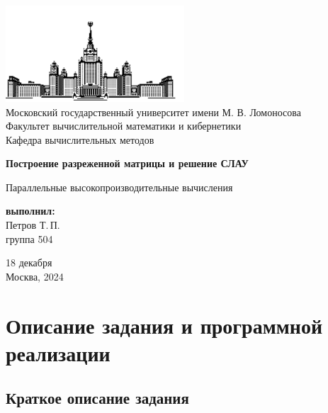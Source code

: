 \documentclass[12pt, a4paper]{article}
\begin{document}
	
\thispagestyle{empty}

\begin{center}
	\ \vspace{-3cm}
	
	\includegraphics[width=0.5\textwidth]{msu-eps-converted-to.pdf}\\
	{Московский государственный университет имени М. В. Ломоносова}\\
	Факультет вычислительной математики и кибернетики\\
	Кафедра вычислительных методов
	
	\vspace{6cm}
	
	{\Large \bfseries Построение разреженной матрицы и решение СЛАУ}
	
	\vspace{1cm}
	
	{\large Параллельные высокопроизводительные вычисления}
\end{center}

\vfill

\begin{flushright}
	\textbf{выполнил:}\\
	Петров Т.\,П. \\
	группа 504
\end{flushright}

\vfill

\begin{center}
	18 декабря \\
	Москва, 2024
\end{center}

\enlargethispage{2\baselineskip}

\newpage

\tableofcontents

\newpage

\section{Описание задания и программной реализации}
\subsection{Краткое описание задания}
\end{document}
